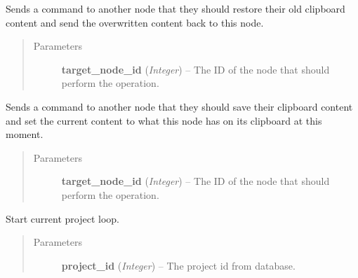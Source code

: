 \documentclass[letterpaper,10pt,english]{sphinxmanual}
\begin{document}
\begin{fulllineitems}
\begin{fulllineitems}
\label{state:state.State.send_pop_clipboard}
Sends a command to another node that they should restore their
old clipboard content and send the overwritten content back to
this node.
\begin{quote}\begin{description}
\item[{Parameters}] \leavevmode
\textbf{target\_node\_id} (\emph{Integer}) -- The ID of the node that should perform the operation.

\end{description}\end{quote}

\end{fulllineitems}


\begin{fulllineitems}
\label{state:state.State.send_push_clipboard}
Sends a command to another node that they should save their
clipboard content and set the current content to what this
node has on its clipboard at this moment.
\begin{quote}\begin{description}
\item[{Parameters}] \leavevmode
\textbf{target\_node\_id} (\emph{Integer}) -- The ID of the node that should perform the operation.

\end{description}\end{quote}

\end{fulllineitems}


\begin{fulllineitems}
\label{state:state.State.set_current_project}
Start current project loop.
\begin{quote}\begin{description}
\item[{Parameters}] \leavevmode
\textbf{project\_id} (\emph{Integer}) -- The project id from database.

\end{description}\end{quote}


\end{fulllineitems}
\end{fulllineitems}
\end{document}
